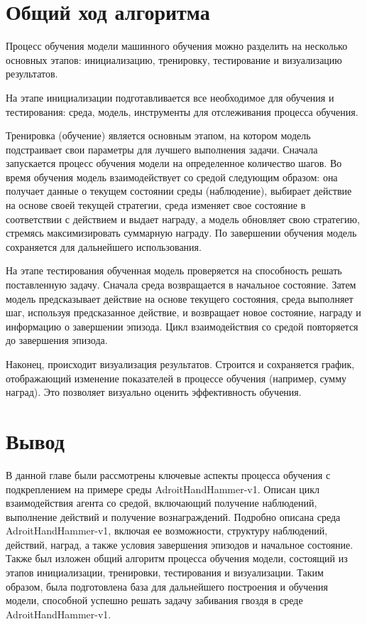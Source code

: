 \section{Общий ход алгоритма}

Процесс обучения модели машинного обучения можно разделить на несколько основных этапов: 
инициализацию, тренировку, тестирование и визуализацию результатов. 

На этапе инициализации подготавливается все необходимое для обучения и тестирования: 
среда, модель, инструменты для отслеживания процесса обучения.

Тренировка (обучение) является основным этапом, на котором модель подстраивает свои параметры для лучшего выполнения задачи. 
Сначала запускается процесс обучения модели на определенное количество шагов. 
Во время обучения модель взаимодействует со средой следующим образом: она получает данные о текущем состоянии среды (наблюдение), 
выбирает действие на основе своей текущей стратегии, среда изменяет свое состояние в соответствии с действием и выдает награду, 
а модель обновляет свою стратегию, стремясь максимизировать суммарную награду. 
По завершении обучения модель сохраняется для дальнейшего использования.

На этапе тестирования обученная модель проверяется на способность решать поставленную задачу. 
Сначала среда возвращается в начальное состояние. 
Затем модель предсказывает действие на основе текущего состояния, среда выполняет шаг, 
используя предсказанное действие, и возвращает новое состояние, награду и информацию о завершении эпизода. 
Цикл взаимодействия со средой повторяется до завершения эпизода.

Наконец, происходит визуализация результатов. 
Строится и сохраняется график, отображающий изменение показателей в процессе обучения (например, сумму наград). 
Это позволяет визуально оценить эффективность обучения.

\section*{Вывод}

В данной главе были рассмотрены ключевые аспекты процесса обучения с подкреплением на примере среды AdroitHandHammer-v1. 
Описан цикл взаимодействия агента со средой, включающий получение наблюдений, выполнение действий и получение вознаграждений. 
Подробно описана среда AdroitHandHammer-v1, включая ее возможности, структуру наблюдений, действий, наград, а также условия завершения эпизодов и начальное состояние. 
Также был изложен общий алгоритм процесса обучения модели, состоящий из этапов инициализации, тренировки, тестирования и визуализации. 
Таким образом, была подготовлена база для дальнейшего построения и обучения модели, способной успешно решать задачу забивания гвоздя в среде AdroitHandHammer-v1.

\clearpage
